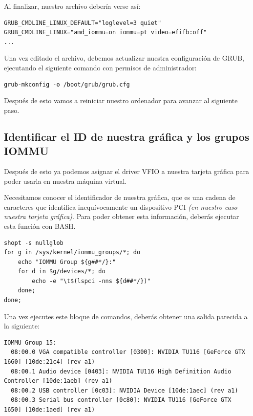\documentclass[12pt]{article}
\begin{document}
Al finalizar, nuestro archivo debería verse así:

\begin{verbatim}
GRUB_CMDLINE_LINUX_DEFAULT="loglevel=3 quiet"
GRUB_CMDLINE_LINUX="amd_iommu=on iommu=pt video=efifb:off"
...
\end{verbatim}

Una vez editado el archivo, debemos actualizar nuestra configuración de GRUB, ejecutando el siguiente comando con permisos de administrador:

\begin{verbatim}
grub-mkconfig -o /boot/grub/grub.cfg
\end{verbatim}

Después de esto vamos a reiniciar nuestro ordenador para avanzar al siguiente paso.

\subsection{Identificar el ID de nuestra gráfica y los grupos IOMMU}

Después de esto ya podemos asignar el driver VFIO a nuestra tarjeta gráfica para poder usarla en nuestra máquina virtual.

Necesitamos conocer el identificador de nuestra gráfica, que es una cadena de caracteres que identifica inequívocamente un dispositivo PCI \emph{(en nuestro caso nuestra tarjeta gráfica)}. Para poder obtener esta información, deberás ejecutar esta función con BASH.

\begin{verbatim}
shopt -s nullglob
for g in /sys/kernel/iommu_groups/*; do
    echo "IOMMU Group ${g##*/}:"
    for d in $g/devices/*; do
        echo -e "\t$(lspci -nns ${d##*/})"
    done;
done;
\end{verbatim}

Una vez ejecutes este bloque de comandos, deberás obtener una salida parecida a la siguiente:

\begin{lstlisting}[basicstyle=\scriptsize\ttfamily]
IOMMU Group 15:
  08:00.0 VGA compatible controller [0300]: NVIDIA TU116 [GeForce GTX 1660] [10de:21c4] (rev a1)
  08:00.1 Audio device [0403]: NVIDIA TU116 High Definition Audio Controller [10de:1aeb] (rev a1)
  08:00.2 USB controller [0c03]: NVIDIA Device [10de:1aec] (rev a1)
  08:00.3 Serial bus controller [0c80]: NVIDIA TU116 [GeForce GTX 1650] [10de:1aed] (rev a1)
\end{lstlisting}
\end{document}
